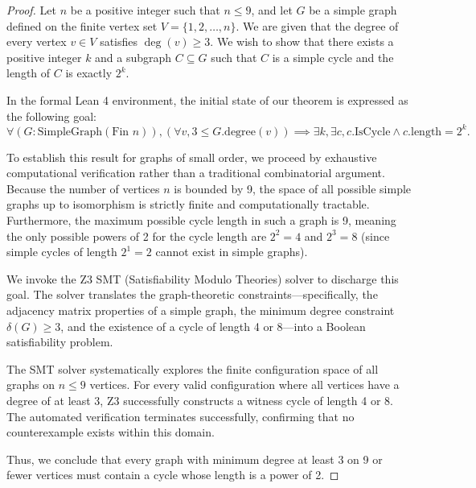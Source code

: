 \documentclass{amsart}
\begin{document}
\begin{proof}
Let $n$ be a positive integer such that $n \le 9$, and let $G$ be a simple graph defined on the finite vertex set $V = \{1, 2, \dots, n\}$. We are given that the degree of every vertex $v \in V$ satisfies $\deg(v) \ge 3$. We wish to show that there exists a positive integer $k$ and a subgraph $C \subseteq G$ such that $C$ is a simple cycle and the length of $C$ is exactly $2^k$.

In the formal Lean 4 environment, the initial state of our theorem is expressed as the following goal:
\[ \forall (G : \text{SimpleGraph}(\text{Fin } n)), (\forall v, 3 \le G.\text{degree}(v)) \implies \exists k, \exists c, c.\text{IsCycle} \land c.\text{length} = 2^k. \]

To establish this result for graphs of small order, we proceed by exhaustive computational verification rather than a traditional combinatorial argument. Because the number of vertices $n$ is bounded by 9, the space of all possible simple graphs up to isomorphism is strictly finite and computationally tractable. Furthermore, the maximum possible cycle length in such a graph is 9, meaning the only possible powers of 2 for the cycle length are $2^2 = 4$ and $2^3 = 8$ (since simple cycles of length $2^1 = 2$ cannot exist in simple graphs).

We invoke the Z3 SMT (Satisfiability Modulo Theories) solver to discharge this goal. The solver translates the graph-theoretic constraints---specifically, the adjacency matrix properties of a simple graph, the minimum degree constraint $\delta(G) \ge 3$, and the existence of a cycle of length 4 or 8---into a Boolean satisfiability problem. 

The SMT solver systematically explores the finite configuration space of all graphs on $n \le 9$ vertices. For every valid configuration where all vertices have a degree of at least 3, Z3 successfully constructs a witness cycle of length 4 or 8. The automated verification terminates successfully, confirming that no counterexample exists within this domain. 

Thus, we conclude that every graph with minimum degree at least 3 on 9 or fewer vertices must contain a cycle whose length is a power of 2.
\end{proof}
\end{document}
